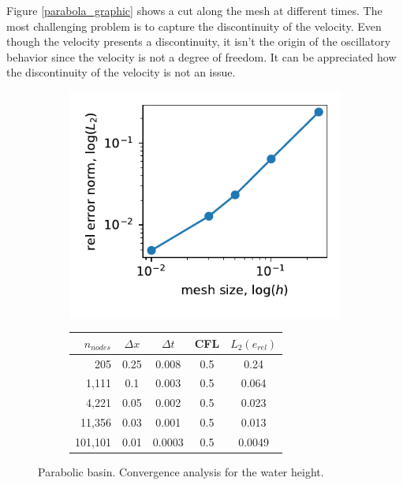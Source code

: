 \documentclass[a4paper,12pt]{elsarticle}
\begin{document}
Figure \ref{parabola_graphic} shows a cut along the mesh at different times. The most challenging problem is to capture the discontinuity of the velocity. Even though the velocity presents a discontinuity, it isn't the origin of the oscillatory behavior since the velocity is not a degree of freedom. It can be appreciated how the discontinuity of the velocity is not an issue.

\begin{figure}
\begin{subfigure}{0.4\textwidth}
    \includegraphics[width=\textwidth]{img/par/conv_1.pdf}    
\end{subfigure}
\hfill
\begin{subfigure}{0.58\textwidth}
    \begin{tabular}{>{\small}rcccc} \hline
    $n_{nodes}$ & $\Delta x$ & $\Delta t$ & CFL & $L_2(e_{rel})$ \\ \hline
205 & 0.25 & 0.008 & 0.5 & 0.24 \\
1,111 & 0.1 & 0.003 & 0.5 & 0.064 \\
4,221 & 0.05 & 0.002 & 0.5 & 0.023 \\
11,356 & 0.03 & 0.001 & 0.5 & 0.013 \\
101,101 & 0.01 & 0.0003 & 0.5 & 0.0049 \\
    \hline
    \end{tabular}
\end{subfigure}
\caption{Parabolic basin. Convergence analysis for the water height.}
\label{parabola_convergence}
\end{figure}
\end{document}
